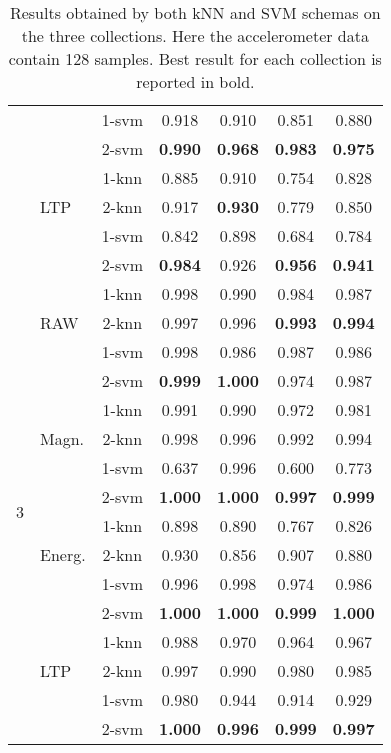 \documentclass[twocolumn]{svjour3}          \smartqed  \usepackage[draft]{hyperref}
\begin{document}
\begin{table}[tb]
\begin{tabular}{llccccc}
&&1-svm&	0.918&	0.910&	0.851&	0.880\\ 
&&2-svm&	\bf{0.990}&	\bf{0.968}&	\bf{0.983}&	\bf{0.975}\\ 
[2pt] 
&\multirow{3}{*}{LTP}	&1-knn&	0.885&	0.910&	0.754&	0.828\\ 
&&2-knn&	0.917&	\bf{0.930}&	0.779&	0.850\\ 
&&1-svm&	0.842&	0.898&	0.684&	0.784\\ 
&&2-svm&	\bf{0.984}&	0.926&	\bf{0.956}&	\bf{0.941}\\ 
[2pt] 
\hline 
\multirow{16}{*}{3}	&\multirow{3}{*}{RAW}	&1-knn&	0.998&	0.990&	0.984&	0.987\\ 
&&2-knn&	0.997&	0.996&	\bf{0.993}&	\bf{0.994}\\ 
&&1-svm&	0.998&	0.986&	0.987&	0.986\\ 
&&2-svm&	\bf{0.999}&	\bf{1.000}&	0.974&	0.987\\ 
[2pt] 
&\multirow{3}{*}{Magn.}	&1-knn&	0.991&	0.990&	0.972&	0.981\\ 
&&2-knn&	0.998&	0.996&	0.992&	0.994\\ 
&&1-svm&	0.637&	0.996&	0.600&	0.773\\ 
&&2-svm&	\bf{1.000}&	\bf{1.000}&	\bf{0.997}&	\bf{0.999}\\ 
[2pt] 
&\multirow{3}{*}{Energ.}	&1-knn&	0.898&	0.890&	0.767&	0.826\\ 
&&2-knn&	0.930&	0.856&	0.907&	0.880\\ 
&&1-svm&	0.996&	0.998&	0.974&	0.986\\ 
&&2-svm&	\bf{1.000}&	\bf{1.000}&	\bf{0.999}&	\bf{1.000}\\ 
[2pt] 
&\multirow{3}{*}{LTP}	&1-knn&	0.988&	0.970&	0.964&	0.967\\ 
&&2-knn&	0.997&	0.990&	0.980&	0.985\\ 
&&1-svm&	0.980&	0.944&	0.914&	0.929\\ 
&&2-svm&	\bf{1.000}&	\bf{0.996}&	\bf{0.999}&	\bf{0.997}\\ 
[2pt] 
\hline 
\end{tabular}
\medskip
\caption{Results obtained by both kNN and SVM schemas on the three collections. Here the accelerometer data contain 128 samples. Best result for each collection is reported in bold.}
\label{table:results1}
 \end{table}
\end{document}
